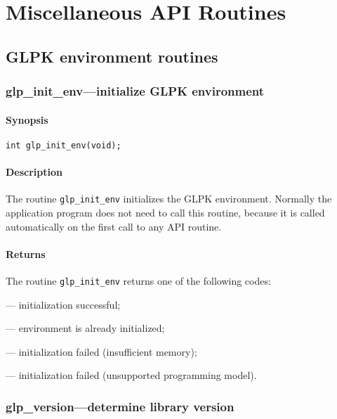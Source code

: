 
\chapter{Miscellaneous API Routines}

\section{GLPK environment routines}

\subsection{glp\_init\_env---initialize GLPK environment}

\subsubsection*{Synopsis}

\begin{verbatim}
int glp_init_env(void);
\end{verbatim}

\subsubsection*{Description}

The routine \verb|glp_init_env| initializes the GLPK environment.
Normally the application program does not need to call this routine,
because it is called automatically on the first call to any API routine.

\subsubsection*{Returns}

The routine \verb|glp_init_env| returns one of the following codes:

 --- initialization successful;

 --- environment is already initialized;

 --- initialization failed (insufficient memory);

 --- initialization failed (unsupported programming model).

\newpage

\subsection{glp\_version---determine library version}

